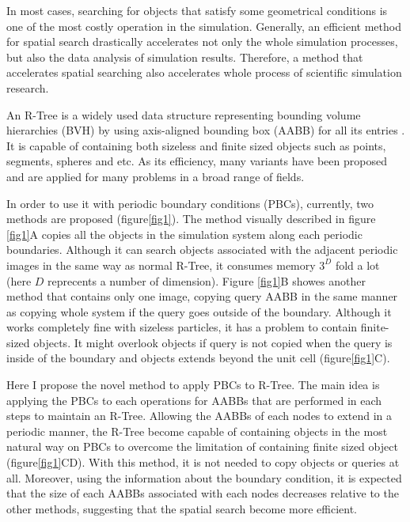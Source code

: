 \documentclass[10pt,letterpaper,twocolumn]{article}
\begin{document}
In most cases, searching for objects that satisfy some geometrical conditions
is one of the most costly operation in the simulation. Generally, an efficient
method for spatial search drastically accelerates not only the whole simulation
processes, but also the data analysis of simulation results. Therefore, a method
that accelerates spatial searching also accelerates whole process of scientific
simulation research.

An R-Tree is a widely used data structure representing bounding volume
hierarchies (BVH) by using axis-aligned bounding box (AABB) for all its entries
\cite{Guttman1984}. It is capable of containing both sizeless and finite sized
objects such as points, segments, spheres and etc. As its efficiency, many
variants have been proposed and are applied for many problems in a broad range
of fields.

In order to use it with periodic boundary conditions (PBCs), currently,
two methods are proposed (figure\ref{fig1})\cite{CoSTR-R-tree2016}.
The method visually described in figure \ref{fig1}A copies all the objects in
the simulation system along each periodic boundaries.
Although it can search objects associated with the adjacent periodic images in
the same way as normal R-Tree, it consumes memory $3^D$ fold a lot (here $D$
reprecents a number of dimension).
Figure \ref{fig1}B showes another method that contains only one image,
copying query AABB in the same manner as copying whole system if the query goes
outside of the boundary.
Although it works completely fine with sizeless particles, it has a problem to
contain finite-sized objects. It might overlook objects if query is not copied
when the query is inside of the boundary and objects extends beyond the unit
cell (figure\ref{fig1}C).

Here I propose the novel method to apply PBCs to R-Tree. The main idea is
applying the PBCs to each operations for AABBs that are performed in each steps
to maintain an R-Tree. Allowing the AABBs of each nodes to extend in a periodic
manner, the R-Tree become capable of containing objects in the most natural way
on PBCs to overcome the limitation of containing finite sized object
(figure\ref{fig1}CD). With this method, it is not needed to copy objects
or queries at all. Moreover, using the information about the boundary condition,
it is expected that the size of each AABBs associated with each nodes decreases
relative to the other methods, suggesting that the spatial search become more
efficient.
\end{document}
